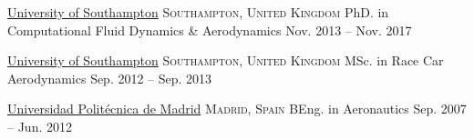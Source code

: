 \documentclass[10pt,a4paper]{article}
\begin{document}
\spacedhrule{2pt}{2pt}


\headedsection
  {\href{https://www.southampton.ac.uk}{University of Southampton}}
  {\textsc{Southampton, United Kingdom}} {%
  \headedsubsection
    {PhD. in Computational Fluid Dynamics \& Aerodynamics}
    {Nov. 2013 -- Nov. 2017}{}}

\headedsection
  {\href{https://www.southampton.ac.uk}{University of Southampton}}
  {\textsc{Southampton, United Kingdom}} {%
  \headedsubsection
    {MSc. in Race Car Aerodynamics}
    {Sep. 2012 -- Sep. 2013}{}}

\headedsection
  {\href{https://www.euita.upm.es}{Universidad Polit\'ecnica de Madrid}}
  {\textsc{Madrid, Spain}} {%
  \headedsubsection
    {BEng. in Aeronautics}
    {Sep. 2007 -- Jun. 2012}{}}

\spacedhrule{20pt}{2pt}

\end{document}
